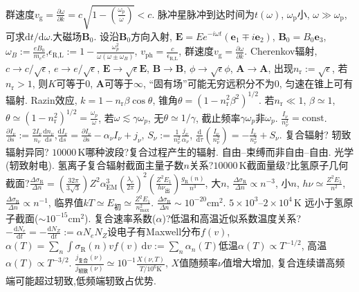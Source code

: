 \documentclass[12pt]{ctexart}
\def\b{\boldsymbol}
\def\d{\mathrm{d}}
\theoremstyle{definition}
\begin{document}
群速度$v_\text{g}=\frac{\partial\omega}{\partial k}=c\sqrt{1-\left(\frac{\omega_p}{\omega}\right)}<c$.
脉冲星脉冲到达时间为$t(\omega)$, $\omega_\text{p}$小, $\omega\gg\omega_\text{p}$, 可求$\d t/\d\omega$.大磁场$\b{B}_0$. 设沿$\b{B}_0$方向入射, $\b{E}=Ee^{-i\omega t}(\b{e}_1\mp i\b{e}_2)$, $\b{B}_0=B_0\b{e}_3$,
$\omega_B:=\frac{eB_0}{m_ec}$,$\epsilon_\text{R,L}:=1-\frac{\omega_p^2}{\omega(\omega\pm\omega_B)}$,
$v_\text{ph}=\frac{c}{\epsilon_\text{R,L}}$,
群速度$v_\text{g}=\frac{\partial\omega}{\partial k}$.
Cherenkov辐射,$c\to c/\sqrt{\epsilon}$, $e\to e/\sqrt{\epsilon}$, $\b{E}\to \sqrt{\epsilon}\b{E}$, $\b{B}\to \b{B}$, $\phi\to \sqrt{\epsilon}\phi$, $\b{A}\to \b{A}$, 出现$n_\text{r}:=\sqrt{\epsilon}$, 若$n_\text{r}>1$, 则$K$可等于$0$, $\b{A}$可等于$\infty$, ``固有场''可能无穷远积分不为$0$, 匀速在锥上可有辐射.
Razin效应,
$k=1-n_\text{r}\beta\cos\theta$, 锥角$\theta=(1-n_\text{r}^2\beta^2)^{1/2}$. 若$n_\text{r}\ll1$, $\beta\simeq1$, $\theta\simeq(1-n_\text{r}^2)^{1/2}=\frac{\omega_p}{\omega}$, 若$\omega\lesssim\gamma\omega_p$, 无$\theta\simeq1/\gamma$, 截止频率$\gamma\omega_p$非$\omega_p$.
$\frac{I_\nu}{n_\nu^2}=\text{const}$. $\frac{\partial I_\nu}{\partial s}:=\frac{2I_\nu}{n_\nu}\frac{\d n_\nu}{\d s}$,$\frac{\d I_\nu}{\d s}=\frac{\partial I_\nu}{\partial s}-\alpha_\nu I_\nu+j_\nu$,
$S_\nu:=\frac{1}{n_\nu^2}\frac{j_\nu}{\alpha_\nu}$,
$\frac{\d }{\d \tau}\left(\frac{I_\nu}{n_\nu^2}\right)=-\frac{I_\nu}{n_\nu^2}+S_\nu$.
复合辐射? 轫致辐射异同? $10000\,\text{K}$哪种波段?复合过程产生的辐射. 自由--束缚而非自由--自由. 光学(轫致射电).
氢离子复合辐射截面主量子数$n$关系?$10000\,\text{K}$截面量级?比氢原子几何截面?$\frac{\Delta \sigma_\text{R}}{\Delta n}
=\left(\frac{32\pi}{3\sqrt{3}}\right)Z^2\alpha_\text{EM}^3\left(\frac{\lambda_e}{2\pi}\right)^2\left(\frac{Z^2E_1}{h\nu_\text{出}}\right)\frac{g_\text{R}(n)}{n^3}$, 大$n$, $\frac{\Delta \sigma_\text{R}}{\Delta n}\propto n^{-3}$, 小$n$, $h\nu\simeq\frac{Z^2E_1}{n^2}$, $\frac{\Delta \sigma_\text{R}}{\Delta n}\propto n^{-1}$, 临界值$kT\simeq E_\text{初}\simeq\frac{Z^2E_1}{n_\text{max}^2}$. $\frac{\Delta \sigma_\text{R}}{\Delta n}\sim10^{-20}\text{cm}^2$. $5\!\times\!10^3\text{--}2\!\times\!10^4\,\text{K}$ 远小于氢原子截面($\sim10^{-15}\text{cm}^2$).
复合速率系数($\alpha$)?低温和高温近似系数温度关系?$-\frac{\d N_e}{\d t}=-\frac{\d N_Z}{\d t}:=\alpha N_eN_Z$设电子有Maxwell分布$f(v)$, $\alpha(T)=\sum_n\int\sigma_\text{R}(n)vf(v)\,\d v:=\sum_n\alpha_n(T)$低温$\alpha(T)\propto T^{-1/2}$, 高温$\alpha(T)\propto T^{-3/2}$.
$\frac{j_\text{复合}(\nu)}{j_\text{轫致}(\nu)}\simeq10^{-1}\frac{X(\nu,T)}{T/10^6\text{K}}$, $X$值随频率$\nu$值增大增加, 复合连续谱高频端可能超过轫致,低频端轫致占优势.
\end{document}

